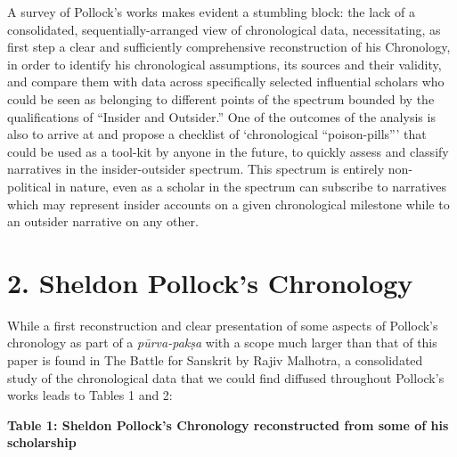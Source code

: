 A survey of Pollock’s works makes evident a stumbling block: the lack of a consolidated, sequentially-arranged view of chronological data, necessitating, as first step a clear and sufficiently comprehensive reconstruction of his Chronology, in order to identify his chronological assumptions, its sources and their validity, and compare them with data across specifically selected influential scholars who could be seen as belonging to different points of the spectrum bounded by the qualifications of “Insider and Outsider.” One of the outcomes of the analysis is also to arrive at and propose a checklist of ‘chronological “poison-pills”’ that could be used as a tool-kit by anyone in the future, to quickly assess and classify narratives in the insider-outsider spectrum. This spectrum is entirely non-political in nature, even as a scholar in the spectrum can subscribe to narratives which may represent insider accounts on a given chronological milestone while to an outsider narrative on any other.


\section*{2. Sheldon Pollock’s Chronology}

While a first reconstruction and clear presentation of some aspects of Pollock’s chronology as part of a \textit{pūrva-pakṣa} with a scope much larger than that of this paper is found in The Battle for Sanskrit by Rajiv Malhotra, a consolidated study of the chronological data that we could find diffused throughout Pollock’s works leads to Tables 1 and 2:

\textbf{Table 1: Sheldon Pollock’s Chronology reconstructed from some of his scholarship}

